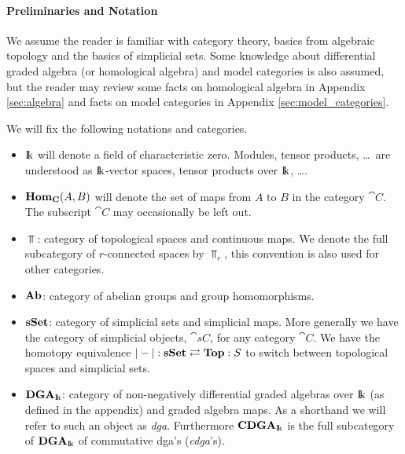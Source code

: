 \paragraph{Preliminaries and Notation}

We assume the reader is familiar with category theory, basics from algebraic topology and the basics of simplicial sets. Some knowledge about differential graded algebra (or homological algebra) and model categories is also assumed, but the reader may review some facts on homological algebra in Appendix \ref{sec:algebra} and facts on model categories in Appendix \ref{sec:model_categories}.

We will fix the following notations and categories.
\begin{itemize}
	\item $\mathrm{I\!k}$ will denote a field of characteristic zero. Modules, tensor products, \dots\, are understood as $\mathrm{I\!k}$-vector spaces, tensor products over $\mathrm{I\!k}$, \dots.
	\item $\mathbf{Hom}_{\mathbf{C}}(A, B)$ will denote the set of maps from $A$ to $B$ in the category $\cat{C}$. The subscript $\cat{C}$ may occasionally be left out.
	\item $\Top$: category of topological spaces and continuous maps. We denote the full subcategory of $r$-connected spaces by $\Top_r$, this convention is also used for other categories.
	\item $\mathbf{Ab}$: category of abelian groups and group homomorphisms.
	\item $\mathbf{s{\mathbf{Set}}}$: category of simplicial sets and simplicial maps. More generally we have the category of simplicial objects, $\cat{sC}$, for any category $\cat{C}$. We have the homotopy equivalence $|-| : \mathbf{s{\mathbf{Set}}} \rightleftarrows \mathbf{Top} : S$ to switch between topological spaces and simplicial sets.
	\item $\mathbf{DGA}_{\mathrm{I\!k}}$: category of non-negatively differential graded algebras over $\mathrm{I\!k}$ (as defined in the appendix) and graded algebra  maps. As a shorthand we will refer to such an object as \emph{dga}. Furthermore $\mathbf{CDGA}_{\mathrm{I\!k}}$ is the full subcategory of $\mathbf{DGA}_{\mathrm{I\!k}}$ of commutative dga's (\emph{cdga}'s).
\end{itemize}

\blankpage
\tableofcontents
{}

